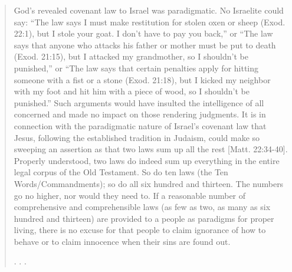 \documentclass[11pt]{article}
\begin{document}
\begin{quote}
God’s revealed covenant law to Israel was paradigmatic.  No Israelite could say: “The law says I must make restitution for stolen oxen or sheep (Exod. 22:1), but I stole your goat. I don’t have to pay you back,” or “The law says that anyone who attacks his father or mother must be put to death (Exod. 21:15), but I attacked my grandmother, so I shouldn’t be punished,” or “The law says that certain penalties apply for hitting someone with a fist or a stone (Exod. 21:18), but I kicked my neighbor with my foot and hit him with a piece of wood, so I shouldn’t be punished.”  Such arguments would have insulted the intelligence of all concerned and made no impact on those rendering judgments.  It is in connection with the paradigmatic nature of Israel’s covenant law that Jesus, following the established tradition in Judaism, could make so sweeping an assertion as that two laws sum up all the rest [Matt. 22:34-40].  Properly understood, two laws do indeed sum up everything in the entire legal corpus of the Old Testament.  So do ten laws (the Ten Words/Commandments); so do all six hundred and thirteen.  The numbers go no higher, nor would they need to.  If a reasonable number of comprehensive and comprehensible laws (as few as two, as many as six hundred and thirteen) are provided to a people as paradigms for proper living, there is no excuse for that people to claim ignorance of how to behave or to claim innocence when their sins are found out.

. . .


\end{quote}
\end{document}
